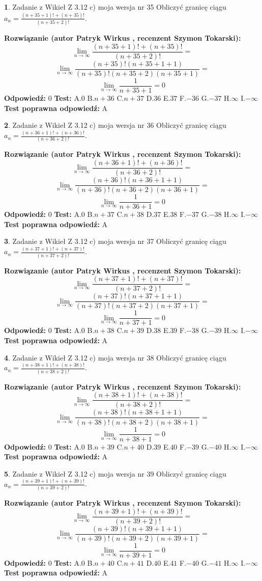 \documentclass[12pt, a4paper]{article}
\theoremstyle{definition} %
\newtheorem{zad}{}
\newcommand{\zadStart}[1]{\begin{zad}#1\newline}
\newcommand{\zadStop}{\end{zad}}
\newcommand{\rozwStart}[2]{\noindent \textbf{Rozwiązanie (autor #1 , recenzent #2): }\newline}
\newcommand{\rozwStop}{\newline}
\newcommand{\odpStart}{\noindent \textbf{Odpowiedź:}\newline}
\newcommand{\odpStop}{\newline}
\newcommand{\testStart}{\noindent \textbf{Test:}\newline}
\newcommand{\testStop}{\newline}
\newcommand{\kluczStart}{\noindent \textbf{Test poprawna odpowiedź:}\newline}
\newcommand{\kluczStop}{\newline}
\begin{document}
\zadStart{Zadanie z Wikieł Z 3.12 c) moja wersja nr 35}
Obliczyć granicę ciągu $a_{n}=\frac{(n+35+1)!+(n+35)!}{(n+35+2)!}$.
\zadStop
\rozwStart{Patryk Wirkus}{Szymon Tokarski}
$$\lim\limits_{n\to\infty}\frac{(n+35+1)!+(n+35)!}{(n+35+2)!}=$$
$$\lim\limits_{n\to\infty}\frac{(n+35)!(n+35+1+1)}{(n+35)!(n+35+2)(n+35+1)}=$$
$$\lim\limits_{n\to\infty}\frac{1}{n+35+1}= 0$$
\rozwStop
\odpStart
$0$
\odpStop
\testStart
A.$0$
B.$n+36$
C.$n+37$
D.$36$
E.$37$
F.$-36$
G.$-37$
H.$\infty$
I.$-\infty$
\testStop
\kluczStart
A
\kluczStop



\zadStart{Zadanie z Wikieł Z 3.12 c) moja wersja nr 36}
Obliczyć granicę ciągu $a_{n}=\frac{(n+36+1)!+(n+36)!}{(n+36+2)!}$.
\zadStop
\rozwStart{Patryk Wirkus}{Szymon Tokarski}
$$\lim\limits_{n\to\infty}\frac{(n+36+1)!+(n+36)!}{(n+36+2)!}=$$
$$\lim\limits_{n\to\infty}\frac{(n+36)!(n+36+1+1)}{(n+36)!(n+36+2)(n+36+1)}=$$
$$\lim\limits_{n\to\infty}\frac{1}{n+36+1}= 0$$
\rozwStop
\odpStart
$0$
\odpStop
\testStart
A.$0$
B.$n+37$
C.$n+38$
D.$37$
E.$38$
F.$-37$
G.$-38$
H.$\infty$
I.$-\infty$
\testStop
\kluczStart
A
\kluczStop



\zadStart{Zadanie z Wikieł Z 3.12 c) moja wersja nr 37}
Obliczyć granicę ciągu $a_{n}=\frac{(n+37+1)!+(n+37)!}{(n+37+2)!}$.
\zadStop
\rozwStart{Patryk Wirkus}{Szymon Tokarski}
$$\lim\limits_{n\to\infty}\frac{(n+37+1)!+(n+37)!}{(n+37+2)!}=$$
$$\lim\limits_{n\to\infty}\frac{(n+37)!(n+37+1+1)}{(n+37)!(n+37+2)(n+37+1)}=$$
$$\lim\limits_{n\to\infty}\frac{1}{n+37+1}= 0$$
\rozwStop
\odpStart
$0$
\odpStop
\testStart
A.$0$
B.$n+38$
C.$n+39$
D.$38$
E.$39$
F.$-38$
G.$-39$
H.$\infty$
I.$-\infty$
\testStop
\kluczStart
A
\kluczStop



\zadStart{Zadanie z Wikieł Z 3.12 c) moja wersja nr 38}
Obliczyć granicę ciągu $a_{n}=\frac{(n+38+1)!+(n+38)!}{(n+38+2)!}$.
\zadStop
\rozwStart{Patryk Wirkus}{Szymon Tokarski}
$$\lim\limits_{n\to\infty}\frac{(n+38+1)!+(n+38)!}{(n+38+2)!}=$$
$$\lim\limits_{n\to\infty}\frac{(n+38)!(n+38+1+1)}{(n+38)!(n+38+2)(n+38+1)}=$$
$$\lim\limits_{n\to\infty}\frac{1}{n+38+1}= 0$$
\rozwStop
\odpStart
$0$
\odpStop
\testStart
A.$0$
B.$n+39$
C.$n+40$
D.$39$
E.$40$
F.$-39$
G.$-40$
H.$\infty$
I.$-\infty$
\testStop
\kluczStart
A
\kluczStop



\zadStart{Zadanie z Wikieł Z 3.12 c) moja wersja nr 39}
Obliczyć granicę ciągu $a_{n}=\frac{(n+39+1)!+(n+39)!}{(n+39+2)!}$.
\zadStop
\rozwStart{Patryk Wirkus}{Szymon Tokarski}
$$\lim\limits_{n\to\infty}\frac{(n+39+1)!+(n+39)!}{(n+39+2)!}=$$
$$\lim\limits_{n\to\infty}\frac{(n+39)!(n+39+1+1)}{(n+39)!(n+39+2)(n+39+1)}=$$
$$\lim\limits_{n\to\infty}\frac{1}{n+39+1}= 0$$
\rozwStop
\odpStart
$0$
\odpStop
\testStart
A.$0$
B.$n+40$
C.$n+41$
D.$40$
E.$41$
F.$-40$
G.$-41$
H.$\infty$
I.$-\infty$
\testStop
\kluczStart
A
\kluczStop
\end{document}
